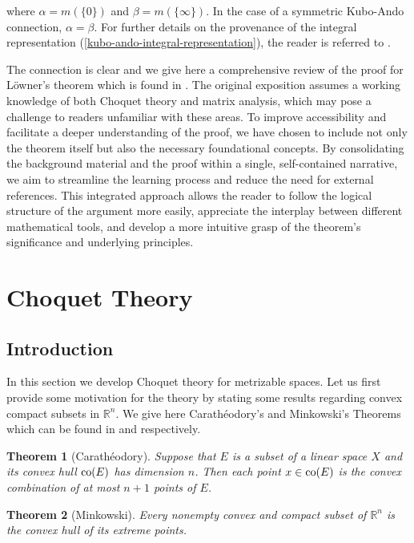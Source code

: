 \documentclass[12pt,a4paper]{amsart}
\newtheorem{theorem}{Theorem}
\theoremstyle{definition}
\begin{document}
	where $\alpha = m(\lbrace0\rbrace)$ and $\beta =m(\lbrace \infty \rbrace)$.
	In the case of a symmetric Kubo-Ando connection, $ \alpha = \beta $. For further details on the provenance of the integral representation (\ref{kubo-ando-integral-representation}), the reader is referred to \cite[Theorem 3.2]{kubo-ando-main}. 
	\par 
	The connection is clear and we give here a comprehensive review of the proof for L\"owner's theorem which is found in \cite{hansen-fasttrack}. The original exposition assumes a working knowledge of both Choquet theory and matrix analysis, which may pose a challenge to readers unfamiliar with these areas. To improve accessibility and facilitate a deeper understanding of the proof, we have chosen to include not only the theorem itself but also the necessary foundational concepts. By consolidating the background material and the proof within a single, self-contained narrative, we aim to streamline the learning process and reduce the need for external references. This integrated approach allows the reader to follow the logical structure of the argument more easily, appreciate the interplay between different mathematical tools, and develop a more intuitive grasp of the theorem's significance and underlying principles.
	
	
	\section{Choquet Theory}
	\subsection{Introduction}
	In this section we develop Choquet theory for metrizable spaces. Let us first provide some motivation for the theory by stating some results regarding convex compact subsets in $\mathbb{R}^{n}$. We give here Carath\'eodory's and Minkowski's Theorems which can be found in \cite[Theorem 3.1.2]{niculescu} and \cite[Theorem 3.3.5]{niculescu} respectively. 
	\begin{theorem}[Carath\'eodory]
		Suppose that $E$ is a subset of a linear space $X$ and its convex hull $\textnormal{co}(E)$ has dimension $n$. Then each point $x \in \textnormal{co}(E)$ is the convex combination of at most $n+1$ points of $E$.
	\end{theorem}
	
	\begin{theorem}[Minkowski]
		Every nonempty convex and compact subset of $\mathbb{R}^{n}$ is the convex hull of its extreme points.
	\end{theorem}
	
\end{document}
